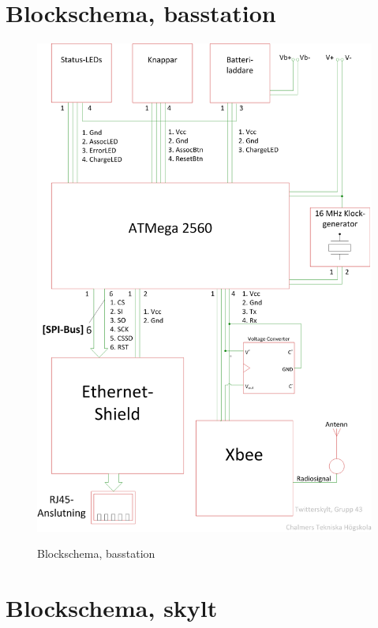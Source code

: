 \documentclass[a4paper,11pt]{article}
\begin{document}
\appendix
\renewcommand{\appendixpagename}{Appendix}
\appendixpage
\renewcommand{\appendixtocname}{Appendix}

\addappheadtotoc

\section{Blockschema, basstation}
\label{sec:block_bas}

\begin{figure}[H]
\includegraphics[scale=0.6, angle=0]{block_bas.png}
\label{fig:block_bas}
\caption{Blockschema, basstation}
\end{figure}
\pagebreak

\section{Blockschema, skylt}
\label{sec:block_skylt}
\end{document}
